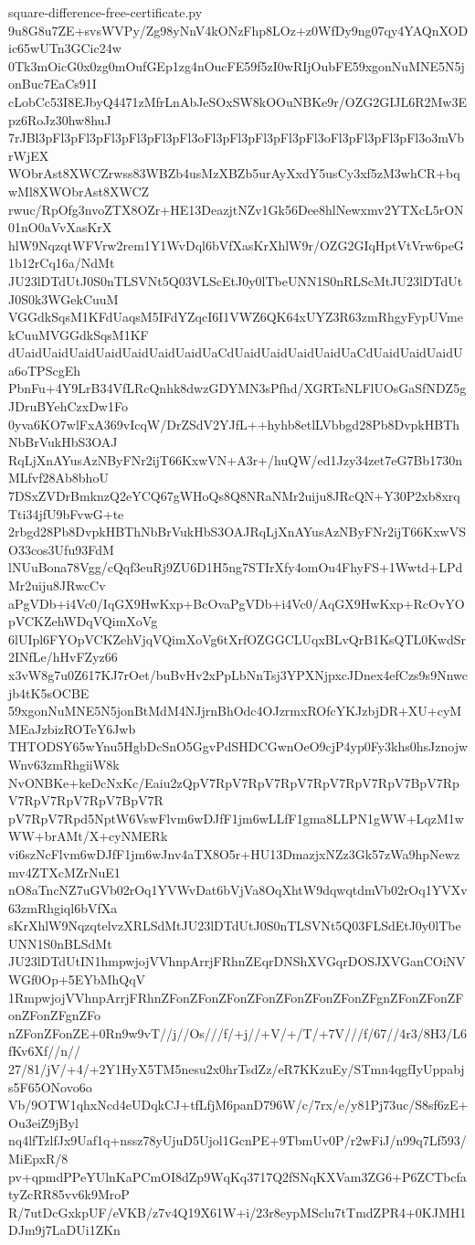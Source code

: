 \documentclass[11pt]{article}
\theoremstyle{definition}
\theoremstyle{remark}
\begin{document}
\begin{filecontents*}[overwrite]{square-difference-free-certificate.py}
9u8G8u7ZE+svsWVPy/Zg98yNnV4kONzFhp8LOz+z0WfDy9ng07qy4YAQnXODic65wUTn3GCic24w
0Tk3mOicG0x0zg0mOufGEp1zg4nOucFE59f5zI0wRIjOubFE59xgonNuMNE5N5jonBuc7EaCs91I
cLobCc53I8EJbyQ4471zMfrLnAbJeSOxSW8kOOuNBKe9r/OZG2GIJL6R2Mw3Epz6RoJz30hw8huJ
7rJBl3pFl3pFl3pFl3pFl3pFl3pFl3oFl3pFl3pFl3pFl3pFl3oFl3pFl3pFl3pFl3o3mVbrWjEX
WObrAst8XWCZrwss83WBZb4usMzXBZb5urAyXxdY5usCy3xf5zM3whCR+bqwMl8XWObrAst8XWCZ
rwuc/RpOfg3nvoZTX8OZr+HE13DeazjtNZv1Gk56Dee8hlNewxmv2YTXcL5rON01nO0aVvXasKrX
hlW9NqzqtWFVrw2rem1Y1WvDql6bVfXasKrXhlW9r/OZG2GIqHptVtVrw6peG1b12rCq16a/NdMt
JU23lDTdUtJ0S0nTLSVNt5Q03VLScEtJ0y0lTbeUNN1S0nRLScMtJU23lDTdUtJ0S0k3WGekCuuM
VGGdkSqsM1KFdUaqsM5IFdYZqcI6I1VWZ6QK64xUYZ3R63zmRhgyFypUVmekCuuMVGGdkSqsM1KF
dUaidUaidUaidUaidUaidUaidUaidUaCdUaidUaidUaidUaidUaCdUaidUaidUaidUa6oTPScgEh
PbnFu+4Y9LrB34VfLRcQnhk8dwzGDYMN3sPfhd/XGRTsNLFlUOsGaSfNDZ5gJDruBYehCzxDw1Fo
0yva6KO7wlFxA369vIcqW/DrZSdV2YJfL++hyhb8etlLVbbgd28Pb8DvpkHBThNbBrVukHbS3OAJ
RqLjXnAYusAzNByFNr2ijT66KxwVN+A3r+/huQW/ed1Jzy34zet7eG7Bb1730nMLfvf28Ab8bhoU
7DSxZVDrBmknzQ2eYCQ67gWHoQs8Q8NRaNMr2uiju8JRcQN+Y30P2xb8xrqTti34jfU9bFvwG+te
2rbgd28Pb8DvpkHBThNbBrVukHbS3OAJRqLjXnAYusAzNByFNr2ijT66KxwVSO33cos3Ufu93FdM
lNUuBona78Vgg/cQqf3euRj9ZU6D1H5ng7STIrXfy4omOu4FhyFS+1Wwtd+LPdMr2uiju8JRwcCv
aPgVDb+i4Vc0/IqGX9HwKxp+BcOvaPgVDb+i4Vc0/AqGX9HwKxp+RcOvYOpVCKZehWDqVQimXoVg
6lUIpl6FYOpVCKZehVjqVQimXoVg6tXrfOZGGCLUqxBLvQrB1KsQTL0KwdSr2INfLe/hHvFZyz66
x3vW8g7u0Z617KJ7rOet/buBvHv2xPpLbNnTsj3YPXNjpxcJDnex4efCzs9s9Nnwcjb4tK5sOCBE
59xgonNuMNE5N5jonBtMdM4NJjrnBhOdc4OJzrmxROfcYKJzbjDR+XU+cyMMEaJzbizROTeY6Jwb
THTODSY65wYnu5HgbDcSnO5GgvPdSHDCGwnOeO9cjP4yp0Fy3khs0hsJznojwWnv63zmRhgiiW8k
NvONBKe+keDcNxKc/Eaiu2zQpV7RpV7RpV7RpV7RpV7RpV7RpV7BpV7RpV7RpV7RpV7RpV7BpV7R
pV7RpV7Rpd5NptW6VswFlvm6wDJfF1jm6wLLfF1gma8LLPN1gWW+LqzM1wWW+brAMt/X+cyNMERk
vi6szNcFlvm6wDJfF1jm6wJnv4aTX8O5r+HU13DmazjxNZz3Gk57zWa9hpNewzmv4ZTXcMZrNuE1
nO8aTncNZ7uGVb02rOq1YVWvDat6bVjVa8OqXhtW9dqwqtdmVb02rOq1YVXv63zmRhgiql6bVfXa
sKrXhlW9NqzqtelvzXRLSdMtJU23lDTdUtJ0S0nTLSVNt5Q03FLSdEtJ0y0lTbeUNN1S0nBLSdMt
JU23lDTdUtIN1hmpwjojVVhnpArrjFRhnZEqrDNShXVGqrDOSJXVGanCOiNVWGf0Op+5EYbMhQqV
1RmpwjojVVhnpArrjFRhnZFonZFonZFonZFonZFonZFonZFonZFgnZFonZFonZFonZFonZFgnZFo
nZFonZFonZE+0Rn9w9vT//j//Os///f/+j//+V/+/T/+7V///f/67//4r3/8H3/L6fKv6Xf//n//
27/81/jV/+4/+2Y1HyX5TM5nesu2x0hrTsdZz/eR7KKzuEy/STmn4qgfIyUppabjs5F65ONovo6o
Vb/9OTW1qhxNcd4eUDqkCJ+tfLfjM6panD796W/c/7rx/e/y81Pj73uc/S8sf6zE+Ou3eiZ9jByl
nq4lfTzlfJx9Uaf1q+nssz78yUjuD5Ujol1GcnPE+9TbmUv0P/r2wFiJ/n99q7Lf593/MiEpxR/8
pv+qpmdPPeYUlnKaPCmOI8dZp9WqKq3717Q2fSNqKXVam3ZG6+P6ZCTbcfatyZcRR85vv6k9MroP
R/7utDcGxkpUF/eVKB/z7v4Q19X61W+i/23r8eypMSclu7tTmdZPR4+0KJMH1DJm9j7LaDUi1ZKn

\end{filecontents*}
\end{document}
